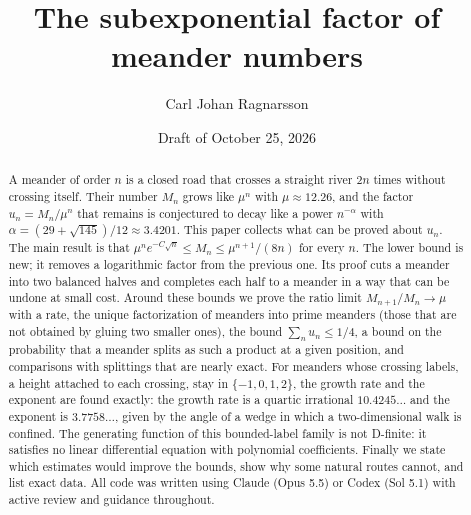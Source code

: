 \documentclass[11pt]{article}
\title{The subexponential factor of meander numbers\seriesline{Paper C.}}
\author{Carl Johan Ragnarsson}
\date{Draft of October 25, 2026}
\begin{document}
\maketitle

\begin{abstract}
A meander of order $n$ is a closed road that crosses a straight river $2n$ times without crossing
itself. Their number $M_n$ grows like $\mu^n$ with $\mu\approx12.26$, and the factor
$u_n=M_n/\mu^n$ that remains is conjectured to decay like a power $n^{-\alpha}$ with
$\alpha=(29+\sqrt{145})/12\approx3.4201$. This paper collects what can be proved about $u_n$. The
main result is that $\mu^n e^{-C\sqrt n}\le M_n\le\mu^{n+1}/(8n)$ for every $n$. The lower bound is
new; it removes a logarithmic factor from the previous one. Its proof cuts a meander into two balanced
halves and completes each half to a meander in a way that can be undone at small cost. Around these
bounds we prove the ratio limit $M_{n+1}/M_n\to\mu$ with a rate, the unique factorization of
meanders into prime meanders (those that are not obtained by gluing two smaller ones), the bound
$\sum_n u_n\le1/4$, a bound on the probability that a meander splits as such a product at a given
position, and comparisons with splittings that are nearly exact. For meanders whose crossing labels, a
height attached to each crossing, stay in $\{-1,0,1,2\}$, the growth rate and the exponent are found
exactly: the growth rate is a quartic irrational $10.4245\ldots$ and the exponent is $3.7758\ldots$,
given by the angle of a wedge in which a two-dimensional walk is confined. The generating function of
this bounded-label family is not D-finite: it satisfies no linear differential equation with polynomial
coefficients. Finally we state which
estimates would improve the bounds, show why some natural routes cannot, and list exact data. All code was written using
Claude (Opus 5.5) or Codex (Sol 5.1) with active review and guidance throughout.
\end{abstract}













\end{document}
